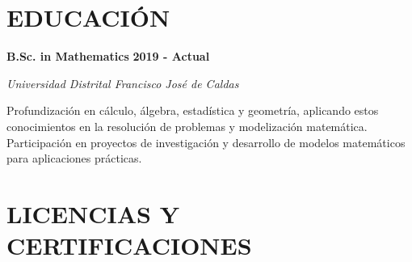\documentclass[paper=a4,fontsize=11pt]{scrartcl} %
\newcommand{\sepspace}{\vspace*{0.8em}}
\newcommand{\NewPart}[1]{\section*{\uppercase{#1}}}
\newcommand{\EducationEntry}[4]{%
  \noindent \textbf{#1} \hfill \textbf{#2} \par
  \noindent \textit{#3} \par
  \noindent \small #4 
  \normalsize \par \sepspace
}
\begin{document}
\sepspace

\NewPart{Educación}

\EducationEntry{B.Sc. in Mathematics}{2019 - Actual}{Universidad Distrital Francisco José de Caldas}{%
Profundización en cálculo, álgebra, estadística y geometría, aplicando estos conocimientos en la resolución de problemas y modelización matemática. Participación en proyectos de investigación y desarrollo de modelos matemáticos para aplicaciones prácticas.
}

\sepspace

\NewPart{Licencias y Certificaciones}
\end{document}
